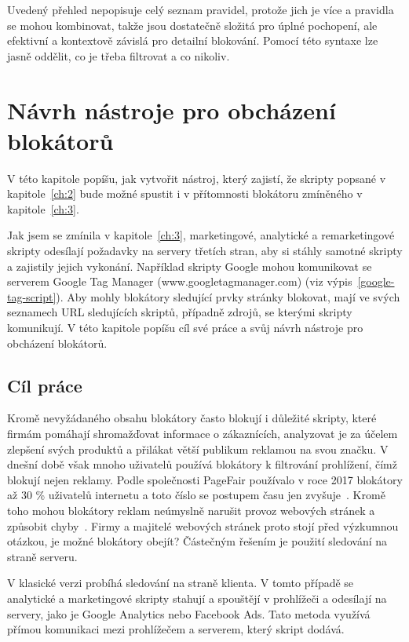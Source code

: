 Uvedený přehled nepopisuje celý seznam pravidel, protože jich je více a pravidla se mohou kombinovat, takže jsou dostatečně složitá pro úplné pochopení, ale efektivní a kontextově závislá pro detailní blokování. Pomocí této syntaxe lze jasně oddělit, co je třeba filtrovat a co nikoliv.


\chapter{Návrh nástroje pro obcházení blokátorů}
\label{ch:4}

V této kapitole popíšu, jak vytvořit nástroj, který zajistí, že skripty popsané v kapitole~\ref{ch:2} bude možné spustit i v přítomnosti blokátoru zmíněného v kapitole~\ref{ch:3}. 

Jak jsem se zmínila v kapitole~\ref{ch:3}, marketingové, analytické a remarketingové skripty odesílají požadavky na servery třetích stran, aby si stáhly samotné skripty a zajistily jejich vykonání. Například skripty Google mohou komunikovat se serverem Google Tag Manager (www.googletagmanager.com) (viz výpis~\ref{google-tag-script}). Aby mohly blokátory sledující prvky stránky blokovat, mají ve svých seznamech URL sledujících skriptů, případně zdrojů, se kterými skripty komunikují.
V této kapitole popíšu cíl své práce a svůj návrh nástroje pro obcházení blokátorů.

\section{Cíl práce}
Kromě nevyžádaného obsahu blokátory často blokují i důležité skripty, které firmám pomáhají shromažďovat informace o zákaznících, analyzovat je za účelem zlepšení svých produktů a přilákat větší publikum reklamou na svou značku. V dnešní době však mnoho uživatelů používá blokátory k filtrování prohlížení, čímž blokují nejen reklamy. Podle společnosti PageFair používalo v roce 2017 blokátory až 30 \% uživatelů internetu a toto číslo se postupem času jen zvyšuje~\cite{freecode}. Kromě toho mohou blokátory reklam neúmyslně narušit provoz webových stránek a způsobit chyby~\cite{ad}. Firmy a majitelé webových stránek proto stojí před výzkumnou otázkou, je možné blokátory obejít? Částečným řešením je použití sledování na straně serveru.

V klasické verzi probíhá sledování na straně klienta. V tomto případě se analytické a marketingové skripty stahují a spouštějí v prohlížeči a odesílají na servery, jako je Google Analytics nebo Facebook Ads. Tato metoda využívá přímou komunikaci mezi prohlížečem a serverem, který skript dodává.

